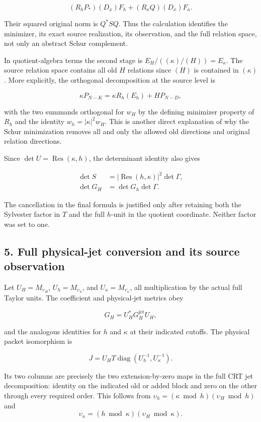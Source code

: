 \[(R_hP_*)(D_x)F_h+(R_\kappa Q)(D_x)F_\kappa.\]

Their squared original norm is \(Q^*SQ\). Thus the calculation identifies
the minimizer, its exact source realization, its observation, and the full
relation space, not only an abstract Schur complement.

In quotient-algebra terms the second stage is
\(E_H/((\kappa)/(H))=E_\kappa\). The source relation space contains all
old \(H\) relations since \((H)\) is contained in \((\kappa)\). More explicitly,
the orthogonal decomposition at the source level is

\[\kappa P_{N-K}=\kappa R_h(E_h)+HP_{N-D},\]

with the two summands orthogonal for \(w_H\) by the defining minimizer
property of \(R_h\) and the identity \(w_h=|\kappa|^2w_H\). This is another
direct explanation of why the Schur minimization removes all and only
the allowed old directions and original relation directions.

Since \(\det U=\operatorname{Res}(\kappa,h)\), the determinant identity also gives

\[\begin{aligned}\det S&=|\operatorname{Res}(h,\kappa)|^2\det\Gamma,\\
\det G_H&=\det G_h\det\Gamma.\end{aligned}\]

The cancellation in the final formula is justified only after retaining
both the Sylvester factor in \(T\) and the full \(h\)-unit in the quotient
coordinate. Neither factor was set to one.

\subsection*{5. Full physical-jet conversion and its source observation}

Let \(U_H=M_{\upsilon_H}\), \(U_h=M_{\upsilon_h}\), and
\(U_\kappa=M_{\upsilon_\kappa}\), all multiplication by the actual full Taylor
units. The coefficient and physical-jet metrics obey

\[G_H=U_H^*G_H^{\mathrm{jet}}U_H,\]

and the analogous identities for \(h\) and \(\kappa\) at their indicated cutoffs.
The physical packet isomorphism is

\[J=U_HT\operatorname{diag}(U_h^{-1},U_\kappa^{-1}).\]

Its two columns are precisely the two extension-by-zero maps in the
full CRT jet decomposition: identity on the indicated old or added
block and zero on the other through every required order. This follows
from \(\upsilon_h=(\kappa\bmod h)(\upsilon_H\bmod h)\) and
\[\upsilon_\kappa=(h\bmod\kappa)(\upsilon_H\bmod\kappa).\]

